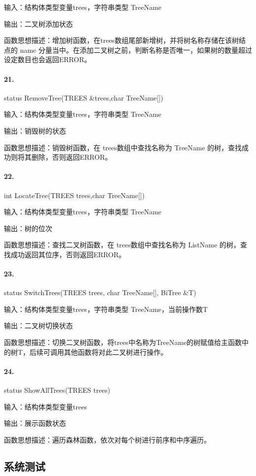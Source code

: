 \documentclass[supercite]{Experimental_Report}
\theoremstyle{definition}
\begin{document}
输入：结构体类型变量trees，字符串类型 TreeName

输出：二叉树添加状态

函数思想描述：增加树函数，在trees数组尾部新增树，并将树名称存储在该树结点的 name 分量当中。在添加二叉树之前，判断名称是否唯一，如果树的数量超过设定数目也会返回ERROR。

\paragraph{21.}status RemoveTree(TREES \&trees,char TreeName[])

输入：结构体类型变量trees，字符串类型 TreeName

输出：销毁树的状态

函数思想描述：销毁树函数，在 trees数组中查找名称为 TreeName 的树，查找成功则将其删除，否则返回ERROR。

\paragraph{22.}int LocateTree(TREES trees,char TreeName[])

输入：结构体类型变量trees，字符串类型 TreeName

输出：树的位次

函数思想描述：查找二叉树函数，在 trees数组中查找名称为 ListName 的树，查找成功返回其位序，否则返回ERROR。

\paragraph{23.}status SwitchTrees(TREES trees, char TreeName[], BiTree \&T)

输入：结构体类型变量trees，字符串类型 TreeName，当前操作数T

输出：二叉树切换状态

函数思想描述：切换二叉树函数，将trees中名称为TreeName的树赋值给主函数中的树T，后续可调用其他函数将对此二叉树进行操作。

\paragraph{24.}status ShowAllTrees(TREES trees)

输入：结构体类型变量trees

输出：展示函数状态

函数思想描述：遍历森林函数，依次对每个树进行前序和中序遍历。

\subsection{系统测试}
\end{document}
